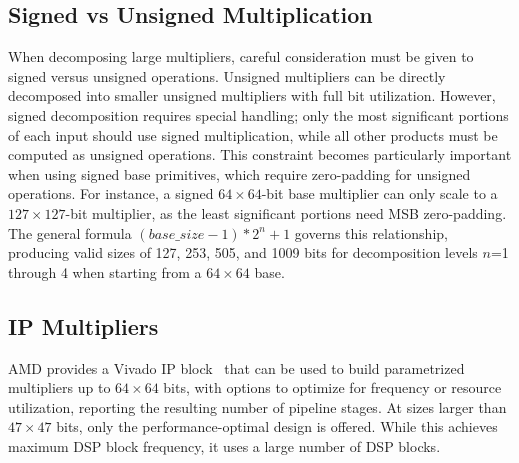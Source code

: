 \documentclass[conference]{IEEEtran}
\begin{document}


\subsection{Signed vs Unsigned Multiplication} \label{sec_sign_unsigned_mult}
When decomposing large multipliers, careful consideration must be given to signed versus unsigned operations.
Unsigned multipliers can be directly decomposed into smaller unsigned multipliers with full bit utilization.
However, signed decomposition requires special handling; only the most significant portions of each input should use signed multiplication, while all other products must be computed as unsigned operations.
This constraint becomes particularly important when using signed base primitives, which require zero-padding for unsigned operations.
For instance, a signed $64\times64$-bit base multiplier can only scale to a $127\times127$-bit multiplier, as the least significant portions need MSB zero-padding. 
The general formula $(\mathit{base\_size}-1)*2^n+1$ governs this relationship, producing valid sizes of 127, 253, 505, and 1009 bits for decomposition levels $n$=1 through 4 when starting from a $64\times64$ base. 



\subsection{IP Multipliers} \label{sec_ip_background}
AMD provides a Vivado IP block~\cite{xilinxincIPMultiplier2015} that can be used to build parametrized multipliers up to $64\times64$ bits, with options to optimize for frequency or resource utilization, reporting the resulting number of pipeline stages.
At sizes larger than $47\times47$ bits, only the performance-optimal design is offered.
While this achieves maximum DSP block frequency, it uses a large number of DSP blocks. 




% 




\end{document}
